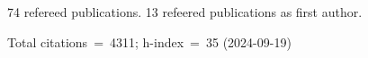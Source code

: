 74 refereed publications. 13 refeered publications as first author.

Total citations~=~4311; h-index~=~35 (2024-09-19)